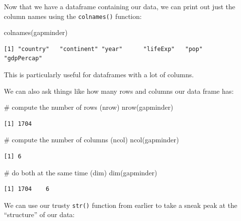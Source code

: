 \documentclass[
  letterpaper,
  DIV=11,
  numbers=noendperiod]{scrreprt}
\newenvironment{Shaded}{\begin{snugshade}}{\end{snugshade}}
\newcommand{\CommentTok}[1]{\textcolor[rgb]{0.37,0.37,0.37}{#1}}
\newcommand{\FunctionTok}[1]{\textcolor[rgb]{0.28,0.35,0.67}{#1}}
\newcommand{\NormalTok}[1]{\textcolor[rgb]{0.00,0.23,0.31}{#1}}
\begin{document}
Now that we have a dataframe containing our data, we can print out just
the column names using the \texttt{colnames()} function:

\begin{Shaded}
\begin{Highlighting}[]
\FunctionTok{colnames}\NormalTok{(gapminder)}
\end{Highlighting}
\end{Shaded}

\begin{verbatim}
[1] "country"   "continent" "year"      "lifeExp"   "pop"       "gdpPercap"
\end{verbatim}

This is particularly useful for dataframes with a lot of columns.

We can also ask things like how many rows and columns our data frame
has:

\begin{Shaded}
\begin{Highlighting}[]
\CommentTok{\# compute the number of rows (nrow)}
\FunctionTok{nrow}\NormalTok{(gapminder)}
\end{Highlighting}
\end{Shaded}

\begin{verbatim}
[1] 1704
\end{verbatim}

\begin{Shaded}
\begin{Highlighting}[]
\CommentTok{\# compute the number of columns (ncol)}
\FunctionTok{ncol}\NormalTok{(gapminder)}
\end{Highlighting}
\end{Shaded}

\begin{verbatim}
[1] 6
\end{verbatim}

\begin{Shaded}
\begin{Highlighting}[]
\CommentTok{\# do both at the same time (dim)}
\FunctionTok{dim}\NormalTok{(gapminder)}
\end{Highlighting}
\end{Shaded}

\begin{verbatim}
[1] 1704    6
\end{verbatim}

We can use our trusty \texttt{str()} function from earlier to take a
sneak peak at the ``structure'' of our data:
\end{document}
